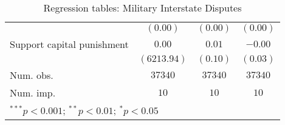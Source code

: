 \begin{table}
\begin{center}
\begin{tabular}{l c c c}
                           & $(0.00)$      & $(0.00)$     & $(0.00)$    \\
Support capital punishment & $0.00$        & $0.01$       & $-0.00$     \\
                           & $(6213.94)$   & $(0.10)$     & $(0.03)$    \\
\midrule
Num. obs.                  & $37340$       & $37340$      & $37340$     \\
Num. imp.                  & $10$          & $10$         & $10$        \\
\bottomrule
\multicolumn{4}{l}{\scriptsize{$^{***}p<0.001$; $^{**}p<0.01$; $^{*}p<0.05$}}
\end{tabular}
\caption{Regression tables: Military Interstate Disputes}
\label{MIDReg}
\end{center}
\end{table}

